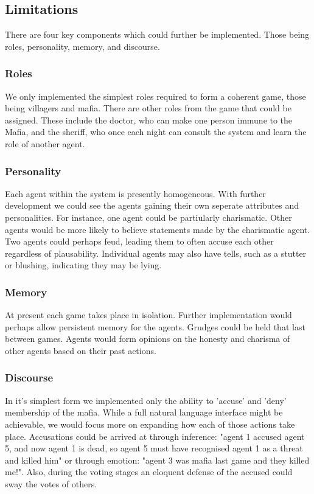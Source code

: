 \documentclass[12pt]{article} %
\begin{document}
\subsection{Limitations}

There are four key components which could further be implemented. Those being roles, personality, memory, and discourse.

\subsubsection{Roles}
We only implemented the simplest roles required to form a coherent game, those being villagers and mafia. There are other roles from the game that could be assigned. These include the doctor, who can make one person immune to the Mafia, and the sheriff, who once each night can consult the system and learn the role of another agent.

\subsubsection{Personality}
Each agent within the system is presently homogeneous. With further development we could see the agents gaining their own seperate attributes and personalities. For instance, one agent could be partiularly charismatic. Other agents would be more likely to believe statements made by the charismatic agent. Two agents could perhaps feud, leading them to often accuse each other regardless of plausability. Individual agents may also have tells, such as a stutter or blushing, indicating they may be lying.


\subsubsection{Memory}
At present each game takes place in isolation. Further implementation would perhaps allow persistent memory for the agents. Grudges could be held that last between games. Agents would form opinions on the honesty and charisma of other agents based on their past actions.

\subsubsection{Discourse}
In it's simplest form we implemented only the ability to 'accuse' and 'deny' membership of the mafia. While a full natural language interface might be achievable, we would focus more on expanding how each of those actions take place. Accusations could be arrived at through inference: "agent 1 accused agent 5, and now agent 1 is dead, so agent 5 must have recognised agent 1 as a threat and killed him" or through emotion: "agent 3 was mafia last game and they killed me!". Also, during the voting stages an eloquent defense of the accused could sway the votes of others.
\end{document}
